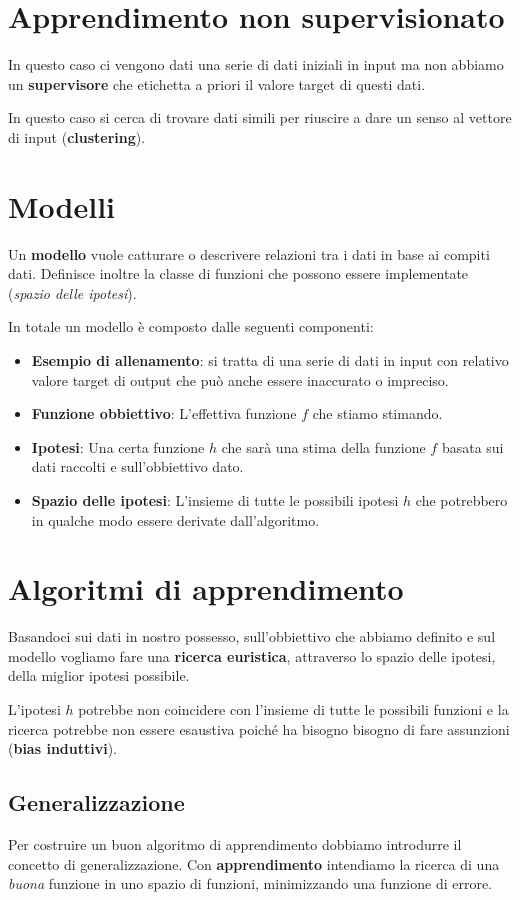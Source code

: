 \section{Apprendimento non supervisionato}
In questo caso ci vengono dati una serie di dati iniziali in input ma non abbiamo un \textbf{supervisore} che etichetta
a priori il valore target di questi dati.

In questo caso si cerca di trovare dati simili per riuscire a dare un senso al vettore di input (\textbf{clustering}).

\section{Modelli}
Un \textbf{modello} vuole catturare o descrivere relazioni tra i dati in base ai compiti dati. Definisce inoltre la classe
di funzioni che possono essere implementate (\emph{spazio delle ipotesi}).

In totale un modello \`e composto dalle seguenti componenti:
\begin{itemize}
	\item \textbf{Esempio di allenamento}: si tratta di una serie di dati in input con relativo valore target di output
	      che pu\`o anche essere inaccurato o impreciso.
	\item \textbf{Funzione obbiettivo}: L'effettiva funzione $f$ che stiamo stimando.
	\item \textbf{Ipotesi}: Una certa funzione $h$ che sar\`a una stima della funzione $f$ basata sui dati raccolti e
	      sull'obbiettivo dato.
	\item \textbf{Spazio delle ipotesi}: L'insieme di tutte le possibili ipotesi $h$ che potrebbero in qualche modo essere
	      derivate dall'algoritmo.
\end{itemize}

\section{Algoritmi di apprendimento}
Basandoci sui dati in nostro possesso, sull'obbiettivo che abbiamo definito e sul modello vogliamo fare una
\textbf{ricerca euristica}, attraverso lo spazio delle ipotesi, della miglior ipotesi possibile.

L'ipotesi $h$ potrebbe non coincidere con l'insieme di tutte le possibili funzioni e la ricerca potrebbe non essere
esaustiva poich\'e ha bisogno bisogno di fare assunzioni (\textbf{bias induttivi}).

\subsection{Generalizzazione}
Per costruire un buon algoritmo di apprendimento dobbiamo introdurre il concetto di generalizzazione. Con
\textbf{apprendimento} intendiamo la ricerca di una \emph{buona} funzione in uno spazio di funzioni, minimizzando una
funzione di errore.

